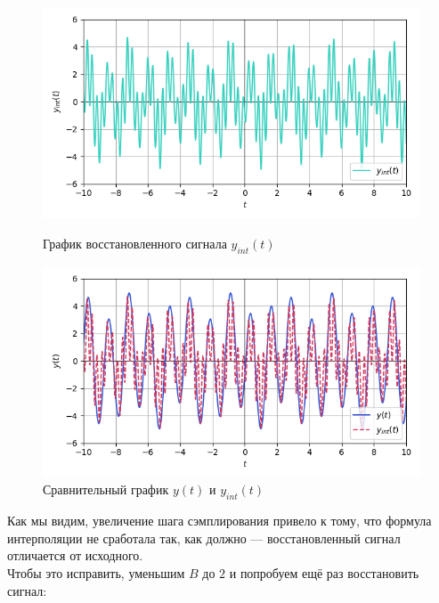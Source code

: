 \documentclass[a4paper]{article}
\begin{document}
\begin{figure}[H]
    \begin{minipage}{0.49\textwidth}
        \centering \includegraphics[width=\textwidth]{sources/second/sins dt=0.25 B=4/4_y_interp.png}
        \caption{График восстановленного сигнала $y_{int}(t)$}
    \end{minipage}\hfill
    \begin{minipage}{0.49\textwidth}
        \centering \includegraphics[width=\textwidth]{sources/second/sins dt=0.25 B=4/5_y_cmp(interpolation).png}
        \caption{Сравнительный график $y(t)$ и $y_{int}(t)$}
    \end{minipage}
\end{figure}
Как мы видим, увеличение шага сэмплирования привело к тому, что формула интерполяции не сработала так, как должно --- восстановленный сигнал отличается от исходного.\\[0.5em]
Чтобы это исправить, уменьшим $B$ до $2$ и попробуем ещё раз восстановить сигнал:
\end{document}
